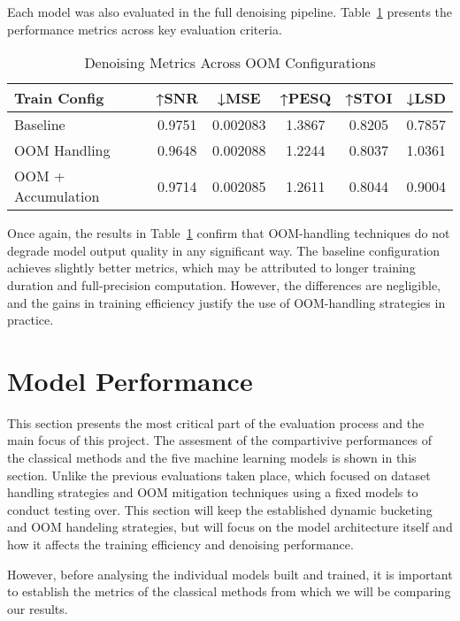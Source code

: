 Each model was also evaluated in the full denoising pipeline. Table~\ref{tab:oom_metrics} presents the performance metrics across key evaluation criteria.

\vspace{1em}
\begin{table}[H]
\centering
\caption{Denoising Metrics Across OOM Configurations}
\label{tab:oom_metrics}
\begin{tabular}{|l|c|c|c|c|c|}
\hline
\textbf{Train Config} & \textbf{↑SNR} & \textbf{↓MSE} & \textbf{↑PESQ} & \textbf{↑STOI} & \textbf{↓LSD} \\
\hline
Baseline               & 0.9751 & 0.002083 & 1.3867 & 0.8205 & 0.7857 \\
OOM Handling           & 0.9648 & 0.002088 & 1.2244 & 0.8037 & 1.0361 \\
OOM + Accumulation     & 0.9714 & 0.002085 & 1.2611 & 0.8044 & 0.9004 \\
\hline
\end{tabular}
\end{table}

Once again, the results in Table~\ref{tab:oom_metrics} confirm that OOM-handling techniques do not degrade model output quality in any significant way. The baseline configuration achieves slightly better metrics, which may be attributed to longer training duration and full-precision computation. However, the differences are negligible, and the gains in training efficiency justify the use of OOM-handling strategies in practice.


\section{Model Performance}
\label{sec:model_performance}

This section presents the most critical part of the evaluation process and the main focus of this project. The assesment of the compartivive performances of the classical methods and the five machine learning models is shown in this section. Unlike the previous evaluations taken place, which focused on dataset handling strategies and OOM mitigation techniques using a fixed models to conduct testing over. This section will keep the established dynamic bucketing and OOM handeling strategies, but will focus on the model architecture itself and how it affects the training efficiency and denoising performance.

However, before analysing the individual models built and trained, it is important to establish the metrics of the classical methods from which we will be comparing our results.